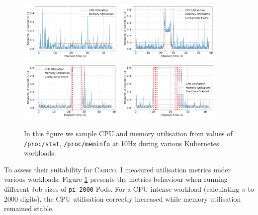 \begin{figure}[H]
    \centering
    \includegraphics[width=0.45\textwidth]{images/utilisation-baseline.pdf}
    \includegraphics[width=0.45\textwidth]{images/utilisation-single.pdf} \\
    \includegraphics[width=0.45\textwidth]{images/utilisation-smallbatch.pdf}
    \includegraphics[width=0.45\textwidth]{images/utilisation-bigbatch.pdf}
    \caption{In this figure we sample CPU and memory utilisation from
    values of \texttt{/proc/stat}, \texttt{/proc/meminfo} at 10Hz during various
    Kubernetes workloads.}
    \label{fig:utilisation-eval}
\end{figure}

To assess their suitability for \textsc{Carico}, I measured utilisation metrics
under various workloads. Figure \ref{fig:utilisation-eval} presents the metrics
behaviour when running different Job sizes of \verb|pi-2000| Pods. For a
CPU-intense workload (calculating $\pi$ to 2000 digits), the CPU utilisation
correctly increased while memory utilisation remained stable.

